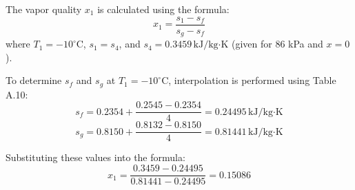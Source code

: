The vapor quality \( x_1 \) is calculated using the formula:  
\[
x_1 = \frac{s_1 - s_f}{s_g - s_f}
\]  
where \( T_1 = -10^\circ\text{C} \), \( s_1 = s_4 \), and \( s_4 = 0.3459 \, \text{kJ/kg·K} \) (given for 86 kPa and \( x = 0 \)).

To determine \( s_f \) and \( s_g \) at \( T_1 = -10^\circ\text{C} \), interpolation is performed using Table A.10:  
\[
s_f = 0.2354 + \frac{0.2545 - 0.2354}{4} = 0.24495 \, \text{kJ/kg·K}
\]  
\[
s_g = 0.8150 + \frac{0.8132 - 0.8150}{4} = 0.81441 \, \text{kJ/kg·K}
\]  

Substituting these values into the formula:  
\[
x_1 = \frac{0.3459 - 0.24495}{0.81441 - 0.24495} = 0.15086
\]